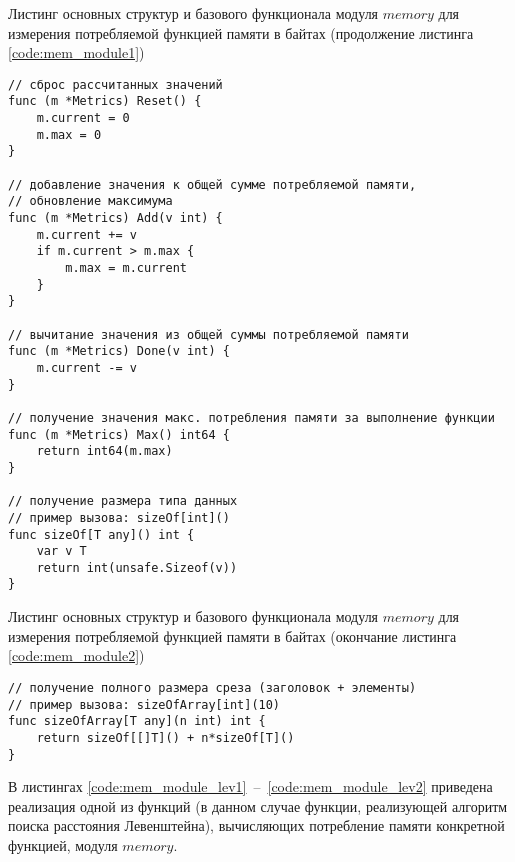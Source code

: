 \begin{code}
\caption{Листинг основных структур и базового функционала модуля $memory$ для измерения потребляемой функцией памяти в байтах (продолжение листинга \ref{code:mem_module1})}
\label{code:mem_module2}

\begin{verbatim}
// сброс рассчитанных значений
func (m *Metrics) Reset() {
	m.current = 0
	m.max = 0
}

// добавление значения к общей сумме потребляемой памяти,
// обновление максимума
func (m *Metrics) Add(v int) {
	m.current += v
	if m.current > m.max {
		m.max = m.current
	}
}

// вычитание значения из общей суммы потребляемой памяти
func (m *Metrics) Done(v int) {
	m.current -= v
}

// получение значения макс. потребления памяти за выполнение функции
func (m *Metrics) Max() int64 {
	return int64(m.max)
}

// получение размера типа данных
// пример вызова: sizeOf[int]()
func sizeOf[T any]() int {
	var v T
	return int(unsafe.Sizeof(v))
}
\end{verbatim}
\end{code}

\begin{code}
\caption{Листинг основных структур и базового функционала модуля $memory$ для измерения потребляемой функцией памяти в байтах (окончание листинга \ref{code:mem_module2})}
\label{code:mem_module3}

\begin{verbatim}
// получение полного размера среза (заголовок + элементы)
// пример вызова: sizeOfArray[int](10)
func sizeOfArray[T any](n int) int {
	return sizeOf[[]T]() + n*sizeOf[T]()
}
\end{verbatim}
\end{code}

В листингах \ref{code:mem_module_lev1}~--~\ref{code:mem_module_lev2} приведена реализация одной из функций (в данном случае функции, реализующей алгоритм поиска расстояния Левенштейна), вычисляющих потребление памяти конкретной функцией, модуля $memory$.

